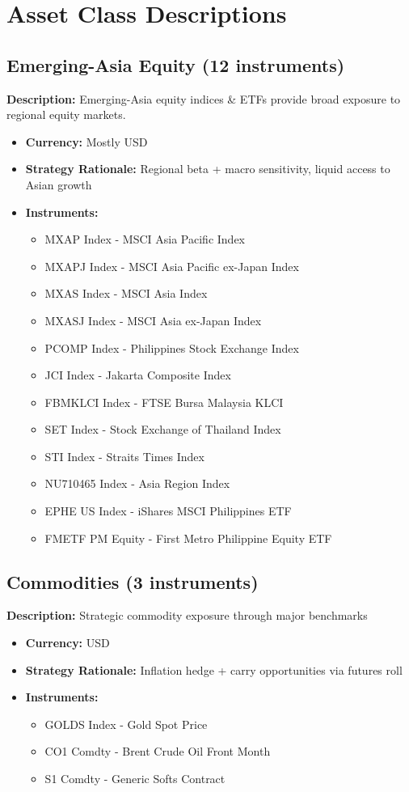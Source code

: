 \documentclass{article}
\begin{document}
\section{Asset Class Descriptions}

\subsection{Emerging-Asia Equity (12 instruments)}
\textbf{Description:} Emerging-Asia equity indices \& ETFs provide broad exposure to regional equity markets.\\
\begin{itemize}
\item \textbf{Currency:} Mostly USD
\item \textbf{Strategy Rationale:} Regional beta + macro sensitivity, liquid access to Asian growth
\item \textbf{Instruments:}
  \begin{itemize}
    \item MXAP Index - MSCI Asia Pacific Index
    \item MXAPJ Index - MSCI Asia Pacific ex-Japan Index
    \item MXAS Index - MSCI Asia Index
    \item MXASJ Index - MSCI Asia ex-Japan Index
    \item PCOMP Index - Philippines Stock Exchange Index
    \item JCI Index - Jakarta Composite Index
    \item FBMKLCI Index - FTSE Bursa Malaysia KLCI
    \item SET Index - Stock Exchange of Thailand Index
    \item STI Index - Straits Times Index
    \item NU710465 Index - Asia Region Index
    \item EPHE US Index - iShares MSCI Philippines ETF
    \item FMETF PM Equity - First Metro Philippine Equity ETF
  \end{itemize}
\end{itemize}

\subsection{Commodities (3 instruments)}
\textbf{Description:} Strategic commodity exposure through major benchmarks\\
\begin{itemize}
\item \textbf{Currency:} USD
\item \textbf{Strategy Rationale:} Inflation hedge + carry opportunities via futures roll
\item \textbf{Instruments:}
  \begin{itemize}
    \item GOLDS Index - Gold Spot Price
    \item CO1 Comdty - Brent Crude Oil Front Month
    \item S1 Comdty - Generic Softs Contract
  \end{itemize}
\end{itemize}
\end{document}
